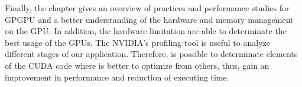 \vspace{4.0em}

Finally, the chapter gives an overview of practices and performance studies for GPGPU and a better understanding of the hardware and memory management on the GPU. In addition, the hardware limitation are able to determinate the best usage of the GPUs. The NVIDIA's profiling tool is useful to analyze different stages of our application. Therefore, is possible to determinate elements of the CUDA code where is better to optimize from others, thus, gain an improvement in performance and reduction of executing time.

